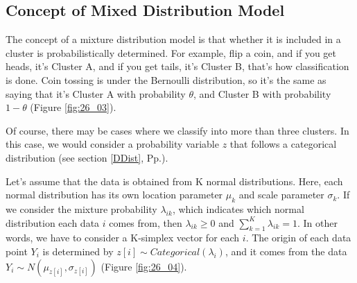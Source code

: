 \documentclass{ltjsbook}
\begin{document}
\subsection{Concept of Mixed Distribution Model}
The concept of a mixture distribution model is that whether it is included in a cluster is probabilistically determined. For example, flip a coin, and if you get heads, it's Cluster A, and if you get tails, it's Cluster B, that's how classification is done. Coin tossing is under the Bernoulli distribution, so it's the same as saying that it's Cluster A with probability $\theta$, and Cluster B with probability $1-\theta$ (Figure \ref{fig:26_03}).


Of course, there may be cases where we classify into more than three clusters. In this case, we would consider a probability variable $z$ that follows a categorical distribution (see section \ref{DDist}, Pp.\pageref{DDist}).

Let's assume that the data is obtained from K normal distributions. Here, each normal distribution has its own location parameter $\mu_k$ and scale parameter $\sigma_k$. If we consider the mixture probability $\lambda_{ik}$, which indicates which normal distribution each data $i$ comes from, then $\lambda_{ik} \ge0$ and $\sum_{k=1}^K \lambda_{ik} = 1$. In other words, we have to consider a K-simplex vector for each $i$.
The origin of each data point $Y_i$ is determined by $z[i] \sim Categorical(\lambda_{i})$, and it comes from the data $Y_i \sim N(\mu_{z[i]},\sigma_{z[i]})$ (Figure \ref{fig:26_04}).
\end{document}
